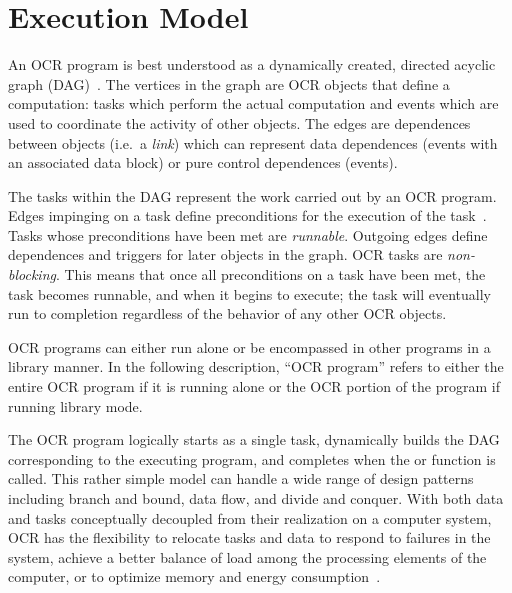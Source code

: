 %

\section{Execution Model}
\label{sec:ExecutionModel}

An OCR program is best understood as a dynamically created,
directed acyclic graph
(DAG)~\cite{TaSa11,Tasirlar11,Zuckerman:2011:UCP:2000417.2000424}.
The vertices in the graph are OCR objects that define a computation:
tasks which perform the actual computation and
events which are used to coordinate the
activity of other objects. The edges are dependences between objects
(i.e.\ a \emph{link}) which can represent data dependences (events with
an associated data block) or pure control dependences (events).

The tasks within the DAG represent the work carried out by an OCR
program. Edges impinging on a task define preconditions for the execution of
the task~\cite{SSWS13}. Tasks whose preconditions have been met are
\emph{runnable}. Outgoing edges define dependences and
triggers for later objects in the graph. OCR tasks are
\emph{non-blocking}. This means that once all
preconditions on a task have been met, the task becomes runnable, and
when it begins to execute; the task will eventually run to completion
regardless of the behavior of any other OCR objects.

OCR programs can either run alone or be encompassed in other programs
in a library manner. In the following description, ``OCR program'' refers
to either the entire OCR program if it is running alone or the OCR
portion of the program if running library mode.

The OCR program logically starts as a single task, dynamically builds the
DAG corresponding to the executing program, and completes when the
 or  function is called.
This rather simple model can handle a wide range of
design patterns including branch and bound, data flow, and divide and
conquer.
%
%
With both data and tasks conceptually decoupled from their realization
on a computer system, OCR has the flexibility to relocate tasks and data
to respond to failures in the system, achieve a better balance of load
among the processing elements of the computer, or to optimize memory
and energy consumption~\cite{GZCS10,Guo10,CTBCCGYS13,SbBS14}.

